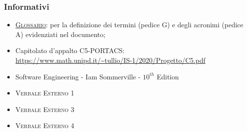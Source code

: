 \subsubsection{Informativi}
\begin{itemize}
\item \textsc{\href{https://github.com/Three-Way-Milkshake/docs/wiki/Glossario}{Glossario}}: per la definizione dei termini (pedice G) e degli acronimi (pedice A) evidenziati nel documento;
\item Capitolato d'appalto C5-PORTACS: \\
{\url{https://www.math.unipd.it/~tullio/IS-1/2020/Progetto/C5.pdf}}
\item Software Engineering - Iam Sommerville - $10^{th}$ Edition
\item \textsc{Verbale Esterno} 1
\item \textsc{Verbale Esterno} 3
\item \textsc{Verbale Esterno} 4


\end{itemize}